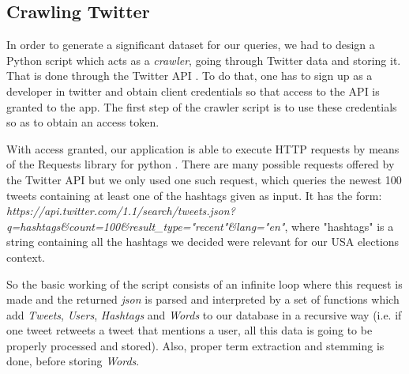 \subsection{Crawling Twitter}

In order to generate a significant dataset for our queries, we had to design a Python script which acts as a \emph{crawler}, going through Twitter data and storing it. That is done through the Twitter API \cite{twitterapi}. To do that, one has to sign up as a developer in twitter and obtain client credentials so that access to the API is granted to the app. The first step of the crawler script is to use these credentials so as to obtain an access token.

With access granted, our application is able to execute HTTP requests by means of the Requests library for python \cite{pyreq}. There are many possible requests offered by the Twitter API but we only used one such request, which queries the newest 100 tweets containing at least one of the hashtags given as input. It has the form: \emph{https://api.twitter.com/1.1/search/tweets.json?q=has\newline htags\&count=100\&result\_type="recent"\&lang="en"}, where "hashtags" is a string containing all the hashtags we decided were relevant for our USA elections context.

So the basic working of the script consists of an infinite loop where this request is made and the returned \emph{json} is parsed and interpreted by a set of functions which add \emph{Tweets}, \emph{Users}, \emph{Hashtags} and \emph{Words} to our database in a recursive way (i.e. if one tweet retweets a tweet that mentions a user, all this data is going to be properly processed and stored). Also, proper term extraction and stemming is done, before storing \emph{Words}.